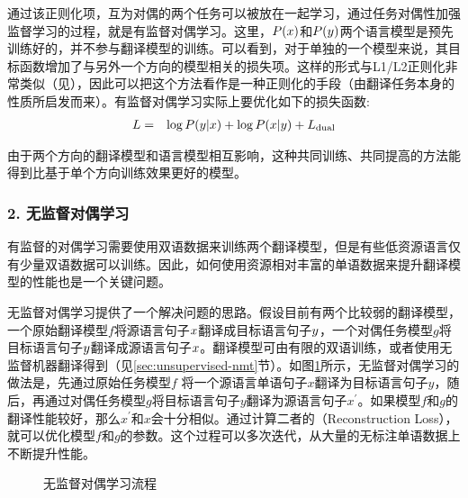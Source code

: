 \parinterval 通过该正则化项，互为对偶的两个任务可以被放在一起学习，通过任务对偶性加强监督学习的过程，就是有监督对偶学习。这里，${P}({x})$和${P}({y})$两个语言模型是预先训练好的，并不参与翻译模型的训练。可以看到，对于单独的一个模型来说，其目标函数增加了与另外一个方向的模型相关的损失项。这样的形式与L1/L2正则化非常类似（见{\chapterthirteen}），因此可以把这个方法看作是一种正则化的手段（由翻译任务本身的性质所启发而来）。有监督对偶学习实际上要优化如下的损失函数:
\begin{eqnarray}
{L} & = &  \log{{P}({y}|{x})}+\log{{P}({x}|{y})}+{L}_{\rm{dual}}
\label{eq:16-5}
\end{eqnarray}

\parinterval 由于两个方向的翻译模型和语言模型相互影响，这种共同训练、共同提高的方法能得到比基于单个方向训练效果更好的模型。

\subsubsection{2. 无监督对偶学习}

\parinterval 有监督的对偶学习需要使用双语数据来训练两个翻译模型，但是有些低资源语言仅有少量双语数据可以训练。因此，如何使用资源相对丰富的单语数据来提升翻译模型的性能也是一个关键问题。

\parinterval 无监督对偶学习提供了一个解决问题的思路。假设目前有两个比较弱的翻译模型，一个原始翻译模型$f$将源语言句子${x}$翻译成目标语言句子${y}$，一个对偶任务模型$g$将目标语言句子${y}$翻译成源语言句子${x}$。翻译模型可由有限的双语训练，或者使用无监督机器翻译得到（见\ref{sec:unsupervised-nmt}节）。如图\ref{fig:16-10}所示，无监督对偶学习的做法是，先通过原始任务模型$f$ 将一个源语言单语句子$x$翻译为目标语言句子$y$，随后，再通过对偶任务模型$g$将目标语言句子$y$翻译为源语言句子$x^{'}$。如果模型$f$和$g$的翻译性能较好，那么$x^{'}$和$x$会十分相似。通过计算二者的{\small{}}（Reconstruction Loss），就可以优化模型$f$和$g$的参数。这个过程可以多次迭代，从大量的无标注单语数据上不断提升性能。

\begin{figure}[htp]
\centering

\caption{无监督对偶学习流程}
\label{fig:16-10}
\end{figure}

